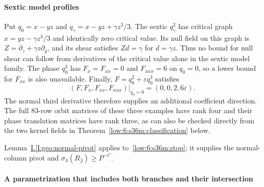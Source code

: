 \documentclass[11pt]{amsart}
\theoremstyle{definition}
\theoremstyle{remark}
\numberwithin{equation}{section}
\newcommand{\partIref}[1]{\hyperref[I:#1]{I.\ref*{I:#1}}}
\begin{document}
\paragraph{Sextic model profiles}

Put $q_0=x-yz$ and $q_\gamma=x-yz+\gamma z^3/3$. The sextic $q_\gamma^2$ has critical graph $x=yz-\gamma z^3/3$ and identically zero critical value. Its null field on this graph is $Z=\partial_z+\gamma z\partial_y$, and its shear satisfies $Zd=\gamma$ for $d=\gamma z$. Thus no bound for null shear can follow from derivatives of the critical value alone in the sextic model family. The phase $q_0^3$ has $F_x=F_{xx}=0$ and $F_{xxx}=6$ on $q_0=0$, so a lower bound for $F_{xx}$ is also unavailable. Finally, $F=q_0^2+\varepsilon q_0^3$ satisfies
\[
\left.(F,F_x,F_{xx},F_{xxx})\right|_{q_0=0}=(0,0,2,6\varepsilon).
\]
The normal third derivative therefore supplies an additional coefficient direction. The full $83$-row orbit matrices of these three examples have rank four and their phase translation matrices have rank three, as can also be checked directly from the two kernel fields in Theorem~\ref{low:6:s36m:classification} below.

Lemma~\partIref{geo:normal-pivot} applies to~\eqref{low:6:s36m:stop}; it supplies the normal-column pivot and $\sigma_4(R_{\widehat J})\ge P^{-C}$.

\paragraph{A parametrization that includes both branches and their intersection}
\end{document}

